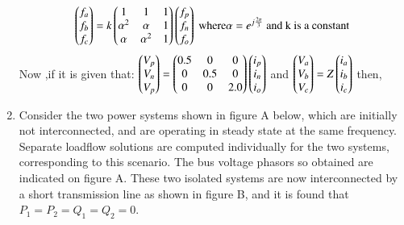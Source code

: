 \documentclass[journal]{IEEEtran}
\begin{document}
\begin{enumerate}
\begin{align*}
    \begin{pmatrix}f_a\\f_b\\f_c\end{pmatrix}=k\begin{pmatrix}1&1&1\\{\alpha}^2&\alpha&1\\\alpha&{\alpha}^2&1\end{pmatrix}\begin{pmatrix}f_p\\f_n\\f_o\end{pmatrix}\text{ where} \alpha=e^{j\frac{2\pi}{3}} \text{ and k is a constant}
\end{align*}
Now ,if it is given that: $\begin{pmatrix}V_p\\V_n\\V_p\end{pmatrix}=\begin{pmatrix}0.5&0&0\\0&0.5&0\\0&0&2.0\end{pmatrix}\begin{pmatrix}i_p\\i_n\\i_o\end{pmatrix}$ and $\begin{pmatrix}V_a\\V_b\\V_c\end{pmatrix}=Z\begin{pmatrix}i_a\\i_b\\i_c\end{pmatrix}$ then, 
\begin{enumerate}
\end{enumerate}
\bigskip
\item Consider the two power systems shown in figure A below, which are initially not interconnected, and are operating in steady state at the same frequency. Separate loadflow solutions are computed individually for the two systems, corresponding to this scenario. The bus voltage phasors so obtained are indicated on figure A. These two isolated systems are now interconnected by a short transmission line as shown in figure B, and it is  found that $P_1=P_2=Q_1=Q_2=0$.

\end{enumerate}
\end{document}
